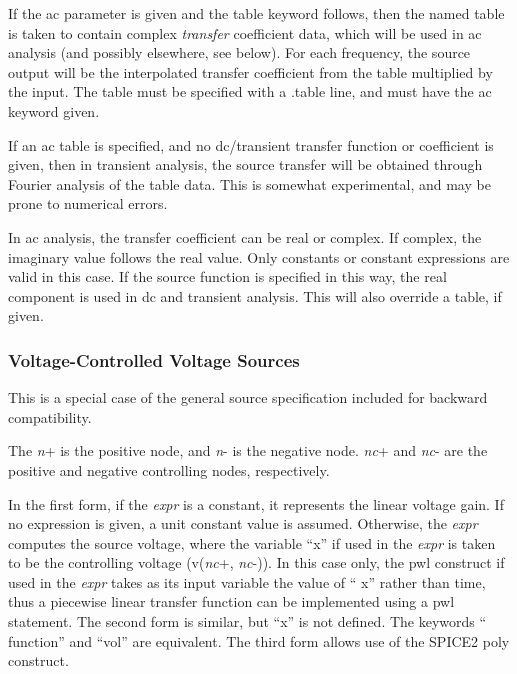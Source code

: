 If the {\vt ac} parameter is given and the {\vt table} keyword
follows, then the named table is taken to contain complex {\it
transfer} coefficient data, which will be used in ac analysis (and
possibly elsewhere, see below).  For each frequency, the source output
will be the interpolated transfer coefficient from the table
multiplied by the input.  The table must be specified with a {\vt
.table} line, and must have the {\vt ac} keyword given.

If an ac table is specified, and no dc/transient transfer function or
coefficient is given, then in transient analysis, the source transfer
will be obtained through Fourier analysis of the table data.  This is
somewhat experimental, and may be prone to numerical errors.

In ac analysis, the transfer coefficient can be real or complex.  If
complex, the imaginary value follows the real value.  Only constants
or constant expressions are valid in this case.  If the source
function is specified in this way, the real component is used in dc
and transient analysis.  This will also override a table, if given.

\subsubsection{Voltage-Controlled Voltage Sources}


This is a special case of the general source specification included
for backward compatibility.


The {\it n\/}{\vt +} is the positive node, and {\it n\/}{\vt -} is the
negative node.  {\it nc\/}{\vt +} and {\it nc\/}{\vt -} are the
positive and negative controlling nodes, respectively.

In the first form, if the {\it expr} is a constant, it represents the
linear voltage gain.  If no expression is given, a unit constant
value is assumed.  Otherwise, the {\it expr} computes the source
voltage, where the variable ``{\vt x}'' if used in the {\it expr} is
taken to be the controlling voltage (v({\it nc\/}{\vt +},{\it
nc\/}{\vt -})).  In this case only, the {\vt pwl} construct if used
in the {\it expr} takes as its input variable the value of ``{\vt
x}'' rather than time, thus a piecewise linear transfer function can
be implemented using a {\vt pwl} statement.  The second form is
similar, but ``{\vt x}'' is not defined.  The keywords ``{\vt
function}'' and ``{\vt vol}'' are equivalent.  The third form allows
use of the SPICE2 {\vt poly} construct.

